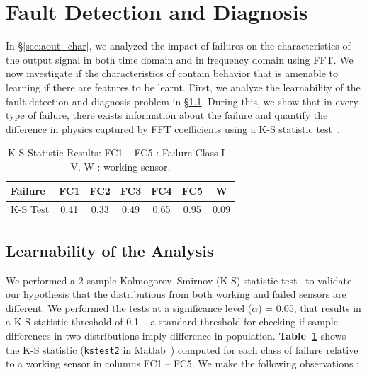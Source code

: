 \section{Fault Detection and Diagnosis} 
\label{sec:system_char}


In \S\ref{sec:aout_char}, we analyzed the impact of failures on the characteristics of the \aout output signal in both time domain and in frequency domain using FFT. We now investigate if the characteristics of \aout contain behavior that is amenable to learning \ie if there are features to be learnt. First, we analyze the learnability of the fault detection and diagnosis problem in \S\ref{subsec:learnability}. During this, we show that in every type of failure, there exists information about the failure and quantify the difference in physics captured by FFT coefficients using a K-S statistic test~\cite{massey1951kolmogorov}.

\begin{table}
	\setlength\tabcolsep{2.5pt}
	\centering
	\caption{{K-S Statistic Results}: FC1 -- FC5 : Failure Class I -- V. W : working sensor.}
		\begin{tabular}{l c c c c c c}
			\hline
			\textbf{Failure} & \textbf{FC1} & \textbf{FC2} & \textbf{FC3} & \textbf{FC4} & \textbf{FC5} & \textbf{W} \\
			\hline \hline
			K-S Test & 0.41 & 0.33 & 0.49 & 0.65 & 0.95 & 0.09 \\
			\hline 
		\end{tabular}
	\label{tbl:ks_test_results}
\end{table}

\subsection{Learnability of the Analysis}
\label{subsec:learnability}

We performed a 2-sample Kolmogorov–Smirnov (K-S) statistic test~\cite{massey1951kolmogorov} to validate our hypothesis that the \aout distributions from both working and failed sensors are different.  We performed the tests at a significance level ($\alpha$) = 0.05, that results in a K-S statistic threshold of 0.1 -- a standard threshold for checking if sample differences in two distributions imply difference in population. {\bfseries Table~\ref{tbl:ks_test_results}} shows the K-S statistic (\texttt{kstest2} in Matlab~\cite{mathworks2015kstest2}) computed for each class of failure relative to a working sensor in columns FC1 -- FC5. We make the following observations :

